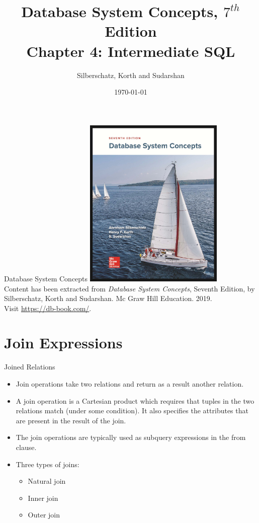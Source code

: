 \documentclass{beamer}
\title[Chapter 4]{Database System Concepts, $7^{th}$ Edition \\ Chapter 4: Intermediate SQL}
\author{Silberschatz, Korth and Sudarshan}
\date{\today}
\begin{document}
\frame{\titlepage}

\begin{frame}{Database System Concepts}
    \centering
    \includegraphics[width=0.5\textwidth]{figures/book_cover.jpg} \\
    \vspace{5mm}
    {
        \tiny
        Content has been extracted from \textit{Database System Concepts}, Seventh Edition, by Silberschatz, Korth and Sudarshan. Mc Graw Hill Education. 2019.\\
        Visit \url{https://db-book.com/}.\\
    }
\end{frame}

\section{Join Expressions}

\begin{frame}{Joined Relations}
    \begin{itemize}
        \item Join operations take two relations and return as a result another relation.
        \item A join operation is a Cartesian product which requires that tuples in the two relations match (under some condition). It also specifies the attributes that are present in the result of the join.
        \item The join operations are typically used as subquery expressions in the from clause.
        \item Three types of joins:
        \begin{itemize}
            \item Natural join
            \item Inner join
            \item Outer join
        \end{itemize}
    \end{itemize}
\end{frame}
\end{document}
